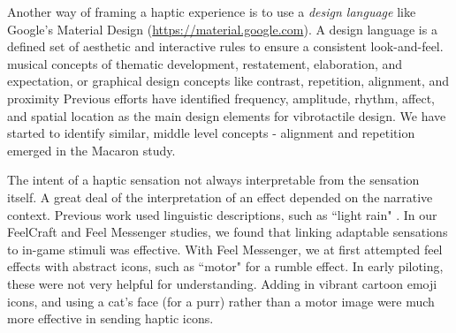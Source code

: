 Another way of framing a haptic experience is to use a \emph{design language} like Google's Material Design (\url{https://material.google.com}).
A design language is a defined set of aesthetic and interactive rules to ensure a consistent look-and-feel.
musical concepts of thematic development, restatement, elaboration, and expectation, or graphical design concepts like contrast, repetition, alignment, and proximity %
Previous efforts have identified frequency, amplitude, rhythm, affect, and spatial location as the main design elements for vibrotactile design.
We have started to identify similar, middle level concepts - alignment and repetition emerged in the Macaron study.


The intent of a haptic sensation  not always interpretable from the sensation itself.
A great deal of the interpretation of an effect depended on the narrative context.
Previous work used linguistic descriptions, such as ``light rain" \cite{Israr2014}.
In our FeelCraft and Feel Messenger studies, we found that linking adaptable sensations to in-game stimuli was effective.
With Feel Messenger, we at first attempted feel effects with abstract icons, such as ``motor" for a rumble effect. 
In early piloting, these were not very helpful for understanding.
Adding in vibrant cartoon emoji icons, and using  a cat's face (for a purr) rather than a motor image were much more effective in sending haptic icons.

%






